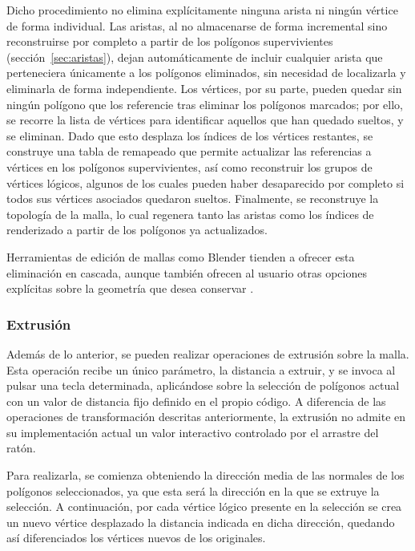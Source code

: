 Dicho procedimiento no elimina explícitamente ninguna arista ni ningún vértice de forma individual. Las aristas, al no almacenarse de forma incremental sino reconstruirse por completo a partir de los polígonos supervivientes (sección~\ref{sec:aristas}), dejan automáticamente de incluir cualquier arista que perteneciera únicamente a los polígonos eliminados, sin necesidad de localizarla y eliminarla de forma independiente. Los vértices, por su parte, pueden quedar sin ningún polígono que los referencie tras eliminar los polígonos marcados; por ello, se recorre la lista de vértices para identificar aquellos que han quedado sueltos, y se eliminan. Dado que esto desplaza los índices de los vértices restantes, se construye una tabla de remapeado que permite actualizar las referencias a vértices en los polígonos supervivientes, así como reconstruir los grupos de vértices lógicos, algunos de los cuales pueden haber desaparecido por completo si todos sus vértices asociados quedaron sueltos. Finalmente, se reconstruye la topología de la malla, lo cual regenera tanto las aristas como los índices de renderizado a partir de los polígonos ya actualizados.

Herramientas de edición de mallas como Blender tienden a ofrecer esta eliminación en cascada, aunque también ofrecen al usuario otras opciones explícitas sobre la geometría que desea conservar \cite{blender-delete}.

\subsubsection{Extrusión} \label{sec:extrusion}

Además de lo anterior, se pueden realizar operaciones de extrusión sobre la malla. Esta operación recibe un único parámetro, la distancia a extruir, y se invoca al pulsar una tecla determinada, aplicándose sobre la selección de polígonos actual con un valor de distancia fijo definido en el propio código. A diferencia de las operaciones de transformación descritas anteriormente, la extrusión no admite en su implementación actual un valor interactivo controlado por el arrastre del ratón.

Para realizarla, se comienza obteniendo la dirección media de las normales de los polígonos seleccionados, ya que esta será la dirección en la que se extruye la selección. A continuación, por cada vértice lógico presente en la selección se crea un nuevo vértice desplazado la distancia indicada en dicha dirección, quedando así diferenciados los vértices nuevos de los originales.

